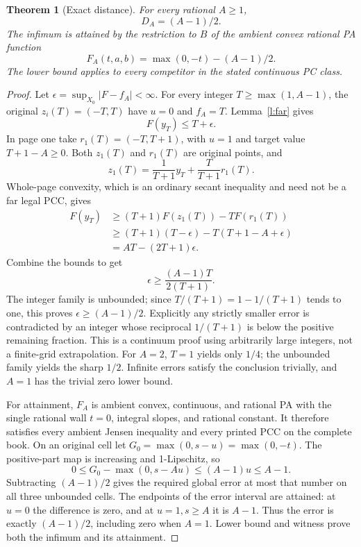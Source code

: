 \documentclass[11pt]{article}
\newtheorem{theorem}{Theorem}[section]
\theoremstyle{definition}\newtheorem{definition}[theorem]{Definition}
\theoremstyle{remark}\newtheorem{remark}[theorem]{Remark}
\begin{document}
\begin{theorem}[Exact distance]\label{t:sharp}
For every rational $A\geq1$,
\[
 \boxed{D_A=(A-1)/2.}
\]
The infimum is attained by the restriction to $B$ of the ambient convex rational PA function
\[
 F_A(t,a,b)=\max(0,-t)-(A-1)/2.
\]
The lower bound applies to every competitor in the stated continuous PC class.
\end{theorem}
\begin{proof}
Let $\epsilon=\sup_{X_0}|F-f_A|<\infty$. For every integer $T\geq\max(1,A-1)$, the original $z_i(T)=(-T,T)$ have $u=0$ and $f_A=T$. Lemma~\ref{l:far} gives
\[
 F(y_T)\leq T+\epsilon.
\]
In page one take $r_1(T)=(-T,T+1)$, with $u=1$ and target value $T+1-A\geq0$. Both $z_1(T)$ and $r_1(T)$ are original points, and
\[
 z_1(T)=\frac1{T+1}y_T+\frac T{T+1}r_1(T).
\]
Whole-page convexity, which is an ordinary secant inequality and need not be a far legal PCC, gives
\begin{align*}
 F(y_T)&\geq(T+1)F(z_1(T))-T F(r_1(T))\\
 &\geq(T+1)(T-\epsilon)-T(T+1-A+\epsilon)\\
 &=AT-(2T+1)\epsilon.
\end{align*}
Combine the bounds to get
\[
 \epsilon\geq\frac{(A-1)T}{2(T+1)}.
\]
The integer family is unbounded; since $T/(T+1)=1-1/(T+1)$ tends to one, this proves $\epsilon\geq(A-1)/2$. Explicitly any strictly smaller error is contradicted by an integer whose reciprocal $1/(T+1)$ is below the positive remaining fraction. This is a continuum proof using arbitrarily large integers, not a finite-grid extrapolation. For $A=2$, $T=1$ yields only $1/4$; the unbounded family yields the sharp $1/2$. Infinite errors satisfy the conclusion trivially, and $A=1$ has the trivial zero lower bound.

For attainment, $F_A$ is ambient convex, continuous, and rational PA with the single rational wall $t=0$, integral slopes, and rational constant. It therefore satisfies every ambient Jensen inequality and every printed PCC on the complete book. On an original cell let $G_0=\max(0,s-u)=\max(0,-t)$. The positive-part map is increasing and 1-Lipschitz, so
\[
 0\leq G_0-\max(0,s-Au)\leq(A-1)u\leq A-1.
\]
Subtracting $(A-1)/2$ gives the required global error at most that number on all three unbounded cells. The endpoints of the error interval are attained: at $u=0$ the difference is zero, and at $u=1,s\geq A$ it is $A-1$. Thus the error is exactly $(A-1)/2$, including zero when $A=1$. Lower bound and witness prove both the infimum and its attainment.
\end{proof}
\end{document}
